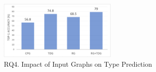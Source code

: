 \begin{figure}[t]%
\begin{center}
\includegraphics[width=2.3in]{figures/sensi-graphs-type-2}
\vspace{-8pt}
\caption{RQ4. Impact of Input Graphs on Type Prediction}
\label{graph-type-result}
\end{center}
\end{figure}



